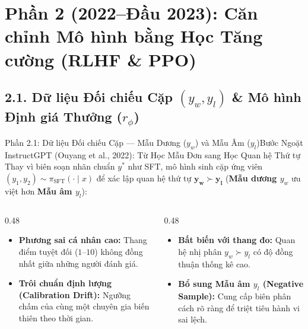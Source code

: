 \section{Phần 2 (2022--Đầu 2023): Căn chỉnh Mô hình bằng Học Tăng cường (RLHF \& PPO)}

\subsection{2.1. Dữ liệu Đối chiếu Cặp $(y_w, y_l)$ \& Mô hình Định giá Thưởng ($r_\phi$)}

\begin{frame}{Phần 2.1: Dữ liệu Đối chiếu Cặp --- Mẫu Dương ($y_w$) và Mẫu Âm ($y_l$)}{Bước Ngoặt InstructGPT (Ouyang et al., 2022): Từ Học Mẫu Đơn sang Học Quan hệ Thứ tự}
  \small
  Thay vì biên soạn nhãn chuẩn $y^*$ như SFT, mô hình sinh cặp ứng viên $(y_1, y_2) \sim \pi_{\text{SFT}}(\cdot \mid x)$ để xác lập quan hệ thứ tự $\mathbf{y_w \succ y_l}$ (\textbf{Mẫu dương $y_w$} ưu việt hơn \textbf{Mẫu âm $y_l$}):

  \vspace{0.08cm}
  \begin{columns}[T,onlytextwidth]
    \begin{column}{0.48\textwidth}
      \footnotesize
      \begin{itemize}\setlength{\itemsep}{6pt}
        \item \textbf{Phương sai cá nhân cao:} Thang điểm tuyệt đối ($1\text{--}10$) không đồng nhất giữa những người đánh giá.
        \item \textbf{Trôi chuẩn định lượng (Calibration Drift):} Ngưỡng chấm của cùng một chuyên gia biến thiên theo thời gian.
      \end{itemize}
    \end{column}
    \begin{column}{0.48\textwidth}
      \footnotesize
      \begin{itemize}\setlength{\itemsep}{6pt}
        \item \textbf{Bất biến với thang đo:} Quan hệ nhị phân $y_w \succ y_l$ có độ đồng thuận thống kê cao.
        \item \textbf{Bổ sung Mẫu âm $y_l$ (Negative Sample):} Cung cấp biên phân cách rõ ràng để triệt tiêu hành vi sai lệch.
      \end{itemize}
    \end{column}
  \end{columns}
\end{frame}

